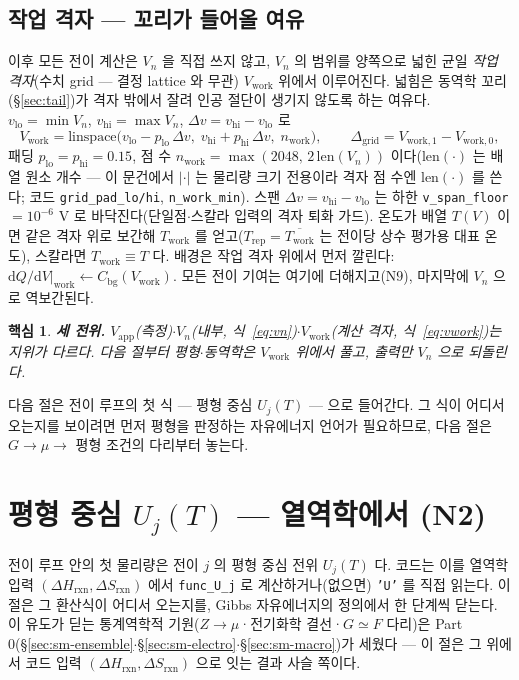 \documentclass[11pt,a4paper]{article}
\newtheorem*{keybox}{핵심}
\newcommand{\dd}{\mathrm{d}}
\newcommand{\app}{\mathrm{app}}
\newcommand{\bg}{\mathrm{bg}}
\newcommand{\rxn}{\mathrm{rxn}}
\newcommand{\work}{\mathrm{work}}
\newcommand{\code}[1]{\texttt{#1}}
\begin{document}
\subsection{작업 격자 — 꼬리가 들어올 여유}
이후 모든 전이 계산은 $V_n$ 을 직접 쓰지 않고, $V_n$ 의 범위를 양쪽으로 넓힌 균일 \emph{작업 격자}(수치 grid — 결정 lattice 와 무관) $V_\work$ 위에서
이루어진다. 넓힘은 동역학 꼬리(\S\ref{sec:tail})가 격자 밖에서 잘려 인공 절단이 생기지 않도록 하는 여유다.
$v_\mathrm{lo}=\min V_n$, $v_\mathrm{hi}=\max V_n$, $\Delta v=v_\mathrm{hi}-v_\mathrm{lo}$ 로
\begin{equation}
V_\work=\mathrm{linspace}\big(v_\mathrm{lo}-p_\mathrm{lo}\,\Delta v,\;
v_\mathrm{hi}+p_\mathrm{hi}\,\Delta v,\;n_\work\big),
\qquad \Delta_\mathrm{grid}=V_{\work,1}-V_{\work,0},
\label{eq:vwork}
\end{equation}
패딩 $p_\mathrm{lo}=p_\mathrm{hi}=0.15$, 점 수 $n_\work=\max(2048,\,2\,\mathrm{len}(V_n))$ 이다($\mathrm{len}(\cdot)$ 는 배열 원소 개수 — 이 문건에서 $|\cdot|$ 는 물리량 크기 전용이라 격자 점 수엔 $\mathrm{len}(\cdot)$ 를 쓴다; 코드 \code{grid\_pad\_lo/hi},
\code{n\_work\_min}). 스팬 $\Delta v=v_\mathrm{hi}-v_\mathrm{lo}$ 는 하한 \code{v\_span\_floor}$=10^{-6}$ V 로
바닥진다(단일점$\cdot$스칼라 입력의 격자 퇴화 가드). 온도가 배열 $T(V)$ 이면 같은 격자 위로 보간해 $T_\work$ 를 얻고($T_\mathrm{rep}=\overline{T_\work}$ 는
전이당 상수 평가용 대표 온도), 스칼라면 $T_\work\equiv T$ 다. 배경은 작업 격자 위에서 먼저 깔린다:
$\dd Q/\dd V|_\work \leftarrow C_\bg(V_\work)$. 모든 전이 기여는 여기에 더해지고($\mathrm N9$), 마지막에 $V_n$ 으로
역보간된다.

\begin{keybox}
\textbf{세 전위.} $V_\app$(측정)$\cdot$$V_n$(내부, 식~\eqref{eq:vn})$\cdot$$V_\work$(계산 격자, 식~\eqref{eq:vwork})는
지위가 다르다. 다음 절부터 평형$\cdot$동역학은 $V_\work$ 위에서 풀고, 출력만 $V_n$ 으로 되돌린다.
\end{keybox}

다음 절은 전이 루프의 첫 식 — 평형 중심 $U_j(T)$ — 으로 들어간다. 그 식이 어디서 오는지를 보이려면 먼저 평형을
판정하는 자유에너지 언어가 필요하므로, 다음 절은 $G\to\mu\to$ 평형 조건의 다리부터 놓는다.

\section{평형 중심 $U_j(T)$ — 열역학에서 (N2)}\label{sec:center}
전이 루프 안의 첫 물리량은 전이 $j$ 의 평형 중심 전위 $U_j(T)$ 다. 코드는 이를 열역학 입력 $(\Delta H_\rxn,\Delta S_\rxn)$
에서 \code{func\_U\_j} 로 계산하거나(없으면) \code{'U'} 를 직접 읽는다. 이 절은 그 환산식이 어디서 오는지를, Gibbs
자유에너지의 정의에서 한 단계씩 닫는다. 이 유도가 딛는 통계역학적 기원($Z\to\mu$·전기화학 결선·$G\simeq F$ 다리)은
Part 0(\S\ref{sec:sm-ensemble}$\cdot$\S\ref{sec:sm-electro}$\cdot$\S\ref{sec:sm-macro})가 세웠다 — 이 절은 그 위에서 코드 입력
$(\Delta H_\rxn,\Delta S_\rxn)$ 으로 잇는 결과 사슬 쪽이다.
\end{document}

